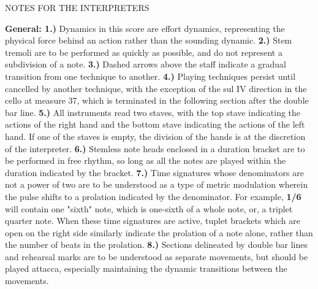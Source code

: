 \documentclass[11pt]{article}
\begin{document}
\begingroup
\begin{center}
\huge 
\end{center}
\endgroup

\begingroup
\begin{center}
\huge NOTES FOR THE INTERPRETERS
\end{center}
\endgroup

\begingroup
\begin{center}
\textbf{General: 1.)} Dynamics in this score are effort dynamics, representing the physical force behind an action rather than the sounding dynamic. \textbf{2.)} Stem tremoli are to be performed as quickly as possible, and do not represent a subdivision of a note. \textbf{3.)} Dashed arrows above the staff indicate a gradual transition from one technique to another. \textbf{4.)}  Playing techniques persist until cancelled by another technique, with the exception of the sul IV direction in the cello at measure 37, which is terminated in the following section after the double bar line. \textbf{5.)}  All instruments read two staves, with the top stave indicating the actions of the right hand and the bottom stave indicating the actions of the left hand. If one of the staves is empty, the division of the hands is at the discretion of the interpreter. \textbf{6.)} Stemless note heads enclosed in a duration bracket are to be performed in free rhythm, so long as all the notes are played within the duration indicated by the bracket. \textbf{7.)} Time signatures whose denominators are not a power of two are to be understood as a type of metric modulation wherein the pulse shifts to a prolation indicated by the denominator. For example, \textbf{1/6} will contain one "sixth" note, which is one-sixth of a whole note, or, a triplet quarter note. When these time signatures are active, tuplet brackets which are open on the right side similarly indicate the prolation of a note alone, rather than the number of beats in the prolation. \textbf{8.)} Sections delineated by double bar lines and rehearsal marks are to be understood as separate movements, but should be played attacca, especially maintaining the dynamic transitions between the movements.\\
\rightskip\leftskip
\end{center}
\endgroup
\end{document}

